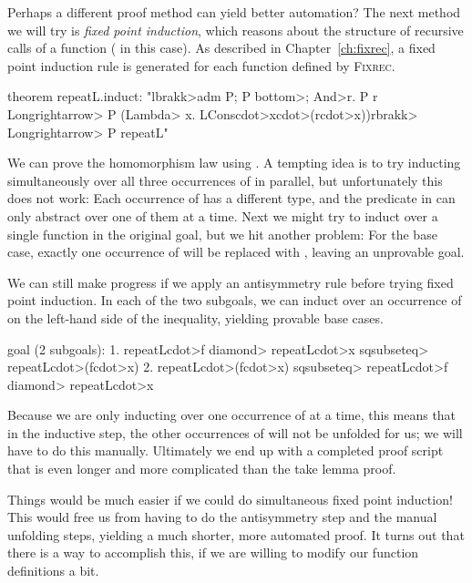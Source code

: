 Perhaps a different proof method can yield better automation? The next method we will try is \emph{fixed point induction}, which reasons about the structure of recursive calls of a function ( in this case). As described in Chapter~\ref{ch:fixrec}, a fixed point induction rule is generated for each function defined by \textsc{Fixrec}.
%
\begin{isacode}
theorem repeatL.induct:
  "\<lbrakk>adm P; P \<bottom>; \<And>r. P r \<Longrightarrow> P (\<Lambda> x. LCons\<cdot>x\<cdot>(r\<cdot>x))\<rbrakk> \<Longrightarrow> P repeatL"
\end{isacode}
%
We can prove the homomorphism law  using . A tempting idea is to try inducting simultaneously over all three occurrences of  in parallel, but unfortunately this does not work: Each occurrence of  has a different type, and the predicate  in  can only abstract over one of them at a time. Next we might try to induct over a single function in the original goal, but we hit another problem: For the base case, exactly one occurrence of  will be replaced with , leaving an unprovable goal.

We can still make progress if we apply an antisymmetry rule before trying fixed point induction. In each of the two subgoals, we can induct over an occurrence of  on the left-hand side of the inequality, yielding provable base cases.
%
\begin{isacode}
goal (2 subgoals):
 1. repeatL\<cdot>f \<diamond> repeatL\<cdot>x \<sqsubseteq> repeatL\<cdot>(f\<cdot>x)
 2. repeatL\<cdot>(f\<cdot>x) \<sqsubseteq> repeatL\<cdot>f \<diamond> repeatL\<cdot>x
\end{isacode}
%
Because we are only inducting over one occurrence of  at a time, this means that in the inductive step, the other occurrences of  will not be unfolded for us; we will have to do this manually. Ultimately we end up with a completed proof script that is even longer and more complicated than the take lemma proof.

Things would be much easier if we could do simultaneous fixed point induction! This would free us from having to do the antisymmetry step and the manual unfolding steps, yielding a much shorter, more automated proof. It turns out that there is a way to accomplish this, if we are willing to modify our function definitions a bit.

